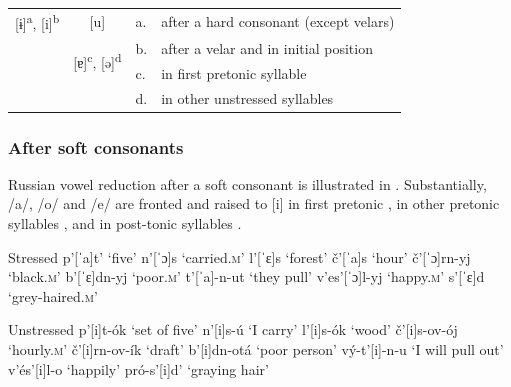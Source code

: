 \documentclass[output=paper,
modfonts,
newtxmath,
hidelinks,
]{langscibook}
\begin{document}
\label{5:4}\\\medskip
\begin{tabular}{|p{1.7cm}|p{1.7cm}|ll}
\cline{1-2}
\multicolumn{1}{|c|}{[ɨ]\textsuperscript{a}, [i]\textsuperscript{b}}&\multicolumn{1}{|c|}{[u]}&a.&after a hard consonant (except velars)\\\hhline{--~~}
\multicolumn{1}{|c|}{\shadecell}&\multicolumn{1}{|c|}{\multirow{2}{*}{[ɐ]\textsuperscript{c}, [ə]\textsuperscript{d}}}&b.&after a velar and in initial position\\\cline{1-1}
\multicolumn{1}{|p{1.7cm}}{}&&c.&in first pretonic syllable\\\cline{1-2}
\multicolumn{2}{c}{}&d.&in other unstressed syllables\\
\end{tabular}
\z


\subsubsection{After soft consonants}\label{5:s2.1.2}

Russian vowel reduction after a soft consonant is illustrated in . Substantially, /a/, /o/ and /e/ are fronted and raised to [i] in first pretonic , in other pretonic syllables , and in post-tonic syllables .

\ea\label{5:5}\begin{multicols}{2}
\begin{xlist}
\exi{} {Stressed}
\ex p’[ˈa]t’ \tabto{2.1cm}‘five’\label{5:5a}
\exi{} n’[ˈɔ]s \tabto{2.1cm}‘carried.\textsc{m}’
\exi{} l’[ˈɛ]s \tabto{2.1cm}‘forest’
\ex č’[ˈa]s \tabto{2.1cm}‘hour’\label{5:5b}
\exi{} č’[ˈɔ]rn-yj \tabto{2.1cm}‘black.\textsc{m}’
\exi{} b’[ˈɛ]dn-yj \tabto{2.1cm}‘poor.\textsc{m}’
\ex t’[ˈa]-n-ut \tabto{2.1cm}‘they pull’\label{5:5c}
\exi{} v’es’[ˈɔ]l-yj \tabto{2.1cm}‘happy.\textsc{m}’
\exi{} s’[ˈɛ]d \tabto{2.1cm}‘grey-haired.\textsc{m}’
\end{xlist}\columnbreak
\begin{xlist}
\exi{} {Unstressed}
\exi{} p’[i]t-ók \tabto{2.1cm}‘set of five’
\exi{} n’[i]s-ú \tabto{2.1cm}‘I carry’
\exi{} l’[i]s-ók \tabto{2.1cm}‘wood’
\exi{} č’[i]s-ov-ój \tabto{2.1cm}‘hourly.\textsc{m}’
\exi{} č’[i]rn-ov-ík \tabto{2.1cm}‘draft’
\exi{} b’[i]dn-otá \tabto{2.1cm}‘poor person’
\exi{} vý-t’[i]-n-u \tabto{2.1cm}‘I will pull out’
\exi{} v’és’[i]l-o \tabto{2.1cm}‘happily’
\exi{} pró-s’[i]d’ \tabto{2.1cm}‘graying hair’
\end{xlist}
\end{multicols}
\z
\end{document}
